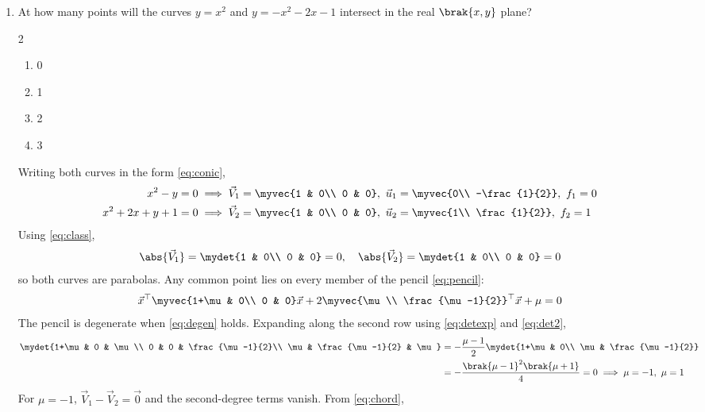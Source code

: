 \begin{enumerate}[label=\thesubsection.\arabic*, ref=\thesubsection.\theenumi, itemsep=0pt, leftmargin=*]
\item At how many points will the curves $y = x^2$ and $y = -x^2 - 2x - 1$ intersect in the real $\brak{x,y}$ plane? \gate
\begin{multicols}{2}
\begin{enumerate}[label=\alph*), itemsep=0pt]
\item 0
\item 1
\item 2
\item 3
\end{enumerate}
\end{multicols}
\solution Writing both curves in the form \eqref{eq:conic},
\begin{align}
x^2 - y = 0 &\implies \vec{V}_1 = \myvec{1 & 0\\ 0 & 0},\ \vec{u}_1 = \myvec{0\\ -\frac{1}{2}},\ f_1 = 0\\
x^2 + 2x + y + 1 = 0 &\implies \vec{V}_2 = \myvec{1 & 0\\ 0 & 0},\ \vec{u}_2 = \myvec{1\\ \frac{1}{2}},\ f_2 = 1
\end{align}
Using \eqref{eq:class},
\begin{align}
\abs{\vec{V}_1} = \mydet{1 & 0\\ 0 & 0} = 0,\quad \abs{\vec{V}_2} = \mydet{1 & 0\\ 0 & 0} = 0
\end{align}
so both curves are parabolas. Any common point lies on every member of the pencil \eqref{eq:pencil}:
\begin{align}
\vec{x}^\top\myvec{1+\mu & 0\\ 0 & 0}\vec{x} + 2\myvec{\mu\\ \frac{\mu-1}{2}}^\top\vec{x} + \mu = 0
\end{align}
The pencil is degenerate when \eqref{eq:degen} holds. Expanding along the second row using \eqref{eq:detexp} and \eqref{eq:det2},
\begin{align}
\mydet{1+\mu & 0 & \mu\\ 0 & 0 & \frac{\mu-1}{2}\\ \mu & \frac{\mu-1}{2} & \mu}
&= -\frac{\mu-1}{2}\mydet{1+\mu & 0\\ \mu & \frac{\mu-1}{2}}\\
&= -\frac{\brak{\mu-1}^2\brak{\mu+1}}{4} = 0 \implies \mu = -1,\ \mu = 1
\end{align}
For $\mu = -1$, $\vec{V}_1 - \vec{V}_2 = \vec{0}$ and the second-degree terms vanish. From \eqref{eq:chord},

\end{enumerate}
